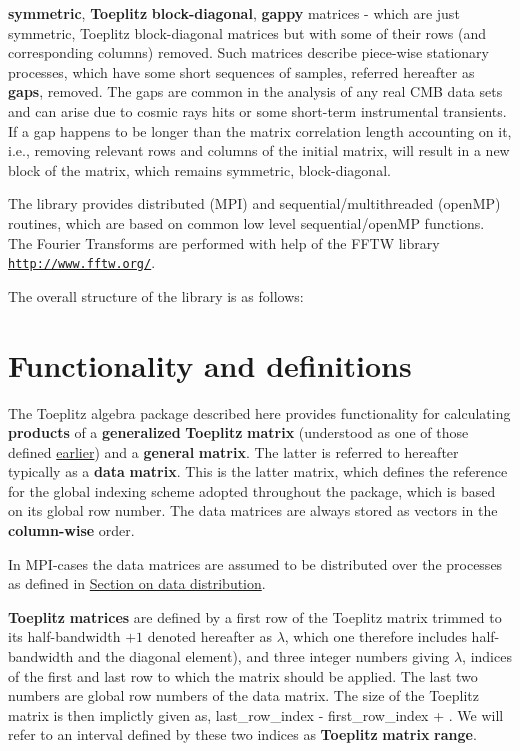 \begin{DoxyItemize}
\item {\bfseries symmetric}, {\bfseries Toeplitz} {\bfseries block-\/diagonal}, {\bfseries gappy} matrices -\/ which are just symmetric, Toeplitz block-\/diagonal matrices but with some of their rows (and corresponding columns) removed. Such matrices describe piece-\/wise stationary processes, which have some short sequences of samples, referred hereafter as {\bfseries gaps}, removed. The gaps are common in the analysis of any real C\-M\-B data sets and can arise due to cosmic rays hits or some short-\/term instrumental transients. If a gap happens to be longer than the matrix correlation length accounting on it, i.\-e., removing relevant rows and columns of the initial matrix, will result in a new block of the matrix, which remains symmetric, block-\/diagonal.
\end{DoxyItemize}

The library provides distributed (M\-P\-I) and sequential/multithreaded (open\-M\-P) routines, which are based on common low level sequential/open\-M\-P functions. The Fourier Transforms are performed with help of the F\-F\-T\-W library \href{http://www.fftw.org/}{\tt http\-://www.\-fftw.\-org/}.

The overall structure of the library is as follows\-:

\section{Functionality and definitions}\label{toeplitz_functionality}
The Toeplitz algebra package described here provides functionality for calculating {\bfseries products} of a {\bfseries generalized} {\bfseries Toeplitz} {\bfseries matrix} (understood as one of those defined \hyperlink{toeplitz_intro}{earlier}) and a {\bfseries general} {\bfseries matrix}. The latter is referred to hereafter typically as a {\bfseries data} {\bfseries matrix}. This is the latter matrix, which defines the reference for the global indexing scheme adopted throughout the package, which is based on its global row number. The data matrices are always stored as vectors in the {\bfseries column-\/wise} order.

In M\-P\-I-\/cases the data matrices are assumed to be distributed over the processes as defined in \hyperlink{toeplitz_datadistr}{Section on data distribution}.

{\bfseries Toeplitz} {\bfseries matrices} are defined by a first row of the Toeplitz matrix trimmed to its half-\/bandwidth $+1$ denoted hereafter as $\lambda$, which one therefore includes half-\/bandwidth and the diagonal element), and three integer numbers giving $\lambda$, indices of the first and last row to which the matrix should be applied. The last two numbers are global row numbers of the data matrix. The size of the Toeplitz matrix is then implictly given as, {\ttfamily last\-\_\-row\-\_\-index} -\/ {\ttfamily first\-\_\-row\-\_\-index} + {}. We will refer to an interval defined by these two indices as {\bfseries Toeplitz} {\bfseries matrix} {\bfseries range}.

